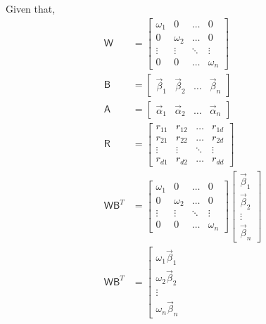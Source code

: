 \documentclass[a4paper, 11pt]{article}
\newcommand{\mat}[1]{\boldsymbol { \mathsf{#1}} }
\begin{document}
\begin{enumerate}[label=\alph*.]
    Given that,
    \begin{align}
        \mat W & = \left[
        \begin{matrix}
            \omega_1 & 0 & \ldots &0\\
            0 & \omega_2 & \ldots &0\\
            \vdots & \vdots & \ddots & \vdots \\
            0 & 0 & \ldots & \omega_n
        \end{matrix} \right] \\
        \mat B & = \left[
        \begin{matrix}
            \vec \beta_1 & \vec \beta_2 & \ldots & \vec \beta_n
        \end{matrix} \right] \\
        \mat A & = \left[
        \begin{matrix}
            \vec \alpha_1 & \vec \alpha_2 & \ldots & \vec \alpha_n
        \end{matrix} \right] \\
        \mat R & = \left[
        \begin{matrix}
            r_{11} & r_{12} & \ldots & r_{1d} \\
            r_{21} & r_{22} & \ldots & r_{2d} \\
            \vdots & \vdots & \ddots & \vdots \\
            r_{d1} & r_{d2} & \ldots & r_{dd} 
        \end{matrix} \right]\\
        \mat W \mat B^T & = \left[
        \begin{matrix}
            \omega_1 & 0 & \ldots &0\\
            0 & \omega_2 & \ldots &0\\
            \vdots & \vdots & \ddots & \vdots \\
            0 & 0 & \ldots & \omega_n
        \end{matrix} \right] \left[
        \begin{matrix}
            \vec \beta_1\\ \vec \beta_2 \\ \vdots \\ \vec \beta_n
        \end{matrix} \right]\\
        \mat W \mat B^T & = \left[
        \begin{matrix}
            \omega_1 \vec \beta_1\\ \omega_2 \vec \beta_2 \\ \vdots \\ \omega_n \vec \beta_n

\end{matrix}
\end{align}
\end{enumerate}
\end{document}

